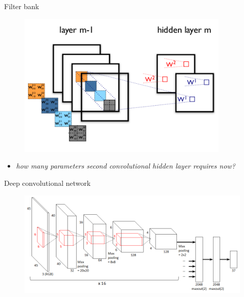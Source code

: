 \documentclass{beamer}
\begin{document}
\begin{frame}{Filter bank}

\begin{figure}[h!]
  \centering
  \includegraphics[width=0.9\textwidth]{images/cnn_explained.png}
\end{figure}

\begin{itemize}
\item \textit{how many parameters second convolutional hidden layer requires now?}
\end{itemize}

\end{frame}


\begin{frame}{Deep convolutional network}

\begin{figure}[h!]
  \centering
  \includegraphics[width=1\textwidth]{images/deep_conv.png}
\end{figure}

\end{frame}
\end{document}
